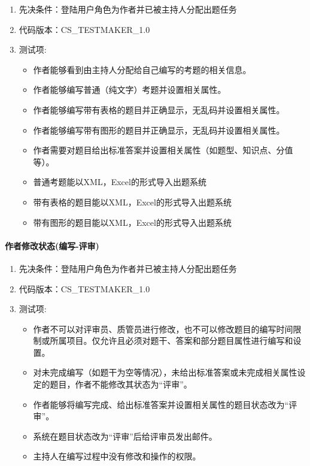 \documentclass[hyperref, a4paper]{ctexart}
\providecommand{\tightlist}{%
  \setlength{\itemsep}{0pt}\setlength{\parskip}{0pt}}
\let\oldparagraph\paragraph
\renewcommand{\paragraph}[1]{\oldparagraph{#1}\mbox{}}
\begin{document}
\begin{enumerate}
\def\labelenumi{\arabic{enumi}.}
\tightlist
\item
  先决条件：登陆用户角色为作者并已被主持人分配出题任务
\item
  代码版本：CS\_TESTMAKER\_1.0
\item
  测试项:

  \begin{itemize}
  \tightlist
  \item
    作者能够看到由主持人分配给自己编写的考题的相关信息。
  \item
    作者能够编写普通（纯文字）考题并设置相关属性。
  \item
    作者能够编写带有表格的题目并正确显示，无乱码并设置相关属性。
  \item
    作者能够编写带有图形的题目并正确显示，无乱码并设置相关属性。
  \item
    作者需要对题目给出标准答案并设置相关属性（如题型、知识点、分值等）。
  \item
    普通考题能以XML，Excel的形式导入出题系统
  \item
    带有表格的题目能以XML，Excel的形式导入出题系统
  \item
    带有图形的题目能以XML，Excel的形式导入出题系统
  \end{itemize}
\end{enumerate}

\hypertarget{ux4f5cux8005ux4feeux6539ux72b6ux6001ux7f16ux5199-ux8bc4ux5ba1}{%
\paragraph{作者修改状态(编写-评审)}\label{ux4f5cux8005ux4feeux6539ux72b6ux6001ux7f16ux5199-ux8bc4ux5ba1}}

\begin{enumerate}
\def\labelenumi{\arabic{enumi}.}
\tightlist
\item
  先决条件：登陆用户角色为作者并已被主持人分配出题任务
\item
  代码版本：CS\_TESTMAKER\_1.0
\item
  测试项:

  \begin{itemize}
  \tightlist
  \item
    作者不可以对评审员、质管员进行修改，也不可以修改题目的编写时间限制或所属项目。仅允许且必须对题干、答案和部分题目属性进行编写和设置。
  \item
    对未完成编写（如题干为空等情况），未给出标准答案或未完成相关属性设定的题目，作者不能修改其状态为``评审''。
  \item
    作者能够将编写完成、给出标准答案并设置相关属性的题目状态改为``评审''。
  \item
    系统在题目状态改为``评审''后给评审员发出邮件。
  \item
    主持人在编写过程中没有修改和操作的权限。
  \end{itemize}
\end{enumerate}
\end{document}
